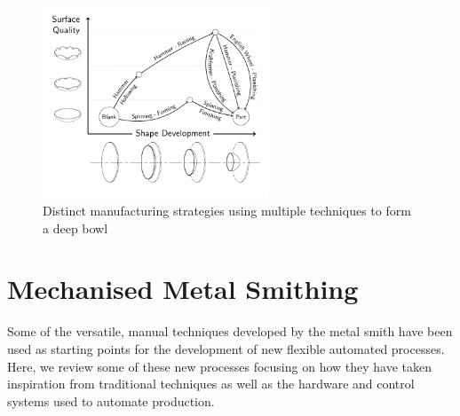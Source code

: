 \begin{figure}[h]
    \centering
    \includegraphics[width=0.6\textwidth]{Images/Bowl.pdf}
    \caption{Distinct manufacturing strategies using multiple techniques to form a deep bowl}
    \label{fig:ShapeDevBow}
\end{figure}




\newpage
\section{Mechanised Metal Smithing} \label{sec:Mechanised}

Some of the versatile, manual techniques developed by the metal smith have been used as starting points for the development of new flexible automated processes. Here, we review some of these new processes focusing on how they have taken inspiration from traditional techniques as well as the hardware and control systems used to automate production.


